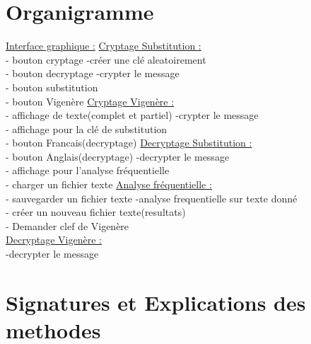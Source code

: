 \documentclass[a4]{article}
\begin{document}
	\section{Organigramme}
			\underline{Interface graphique :}     \hspace{5cm}  \underline{Cryptage Substitution :}\\
			- bouton cryptage            \hspace{5.5cm}       -créer une clé aleatoirement\\
			- bouton decryptage         \hspace{5cm}        -crypter le message\\
			- bouton substitution\\
			- bouton Vigenère           \hspace{5.2cm}       \underline{Cryptage Vigenère :}\\
			- affichage de texte(complet et partiel)  \hspace{2.2cm} -crypter le message\\
			- affichage pour la clé de substitution\\
			- bouton Francais(decryptage)   \hspace{3.5cm}     \underline{Decryptage Substitution :}\\
			- bouton Anglais(decryptage)    \hspace{3.5cm}     -decrypter le message\\
			- affichage pour l'analyse fréquentielle\\
			- charger un fichier texte       \hspace{4.2cm}  \underline{Analyse fréquentielle :}\\
			- sauvegarder un fichier texte     \hspace{3.8cm}  -analyse frequentielle sur texte donné\\
			- créer un nouveau fichier texte(resultats)\\
			- Demander clef de Vigenère\\
			
			\underline{Decryptage Vigenère :}\\
			-decrypter le message
			
			
			
	\section{Signatures et Explications des methodes}
\end{document}
